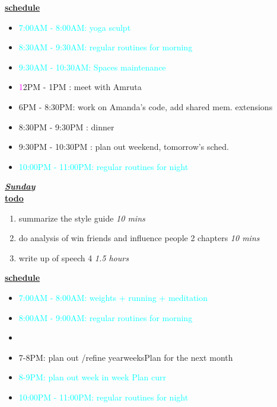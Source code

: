 \documentclass[8pt]{article}
\newcommand{\timeEst}[1]{\textit{#1}}
\newcommand{\regItem}[1]{\item \textcolor{cyan}{#1}}
\newcommand{\situationItem}[1]{\item \textcolor{magenta}{#1}}
\begin{document}
\underline{\textbf{schedule}}\\
\begin{itemize}
\regItem{7:00AM - 8:00AM: yoga sculpt }
\regItem {8:30AM - 9:30AM: regular routines for morning}
\regItem{9:30AM - 10:30AM: Spaces maintenance}
\situationItem 12PM - 1PM :  meet with Amruta
\item 6PM - 8:30PM: work on Amanda's code, add shared mem. extensions
\item 8:30PM - 9:30PM : dinner
\item 9:30PM - 10:30PM : plan out weekend, tomorrow's sched.
\regItem{10:00PM - 11:00PM: regular routines for night}
\end{itemize}

\underline{\textbf{\textit{Sunday}}}\\
\underline{\textbf{todo}}\\
\begin{enumerate}
\item summarize the style guide \timeEst{10 mins}
\item do analysis of win friends and influence people 2 chapters \timeEst{10 mins}
\item  write up of speech 4 \timeEst{1.5 hours}
\end{enumerate}

\underline{\textbf{schedule}}\\
\begin{itemize}
\regItem{7:00AM - 8:00AM: weights + running + meditation }
\regItem {8:00AM - 9:00AM: regular routines for morning}
\item
\item 7-8PM: plan out /refine yearweeksPlan for the next month
\regItem{8-9PM:  plan out week in week Plan curr}
\regItem{10:00PM - 11:00PM: regular routines for night}
\end{itemize}
\end{document}
